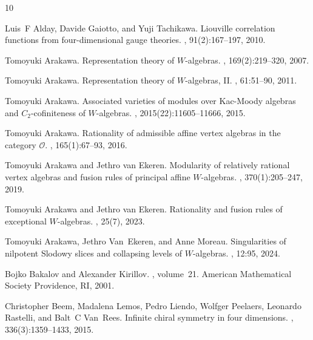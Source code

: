 \documentclass[12pt]{amsart}
\theoremstyle{plain}
\theoremstyle{definition}
\numberwithin{equation}{section}
\begin{document}
\begin{thebibliography}{10}

Luis~F Alday, Davide Gaiotto, and Yuji Tachikawa.
\newblock Liouville correlation functions from four-dimensional gauge theories.
, 91(2):167--197, 2010.

Tomoyuki Arakawa.
\newblock Representation theory of {$W$}-algebras.
, 169(2):219--320, 2007.

Tomoyuki Arakawa.
\newblock Representation theory of {$W$}-algebras, {II}.
, 61:51--90, 2011.

Tomoyuki Arakawa.
\newblock Associated varieties of modules over {K}ac-{M}oody algebras and {$C_2$}-cofiniteness of {$W$}-algebras.
,
  2015(22):11605--11666, 2015.

Tomoyuki Arakawa.
\newblock Rationality of admissible affine vertex algebras in the category
  {$\mathcal{O}$}.
, 165(1):67--93, 2016.

Tomoyuki Arakawa and Jethro van Ekeren.
\newblock Modularity of relatively rational vertex algebras and fusion rules of
  principal affine {$W$}-algebras.
, 370(1):205--247, 2019.

Tomoyuki Arakawa and Jethro van Ekeren.
\newblock Rationality and fusion rules of exceptional {$W$}-algebras.
,
  25(7), 2023.

Tomoyuki Arakawa, Jethro Van~Ekeren, and Anne Moreau.
\newblock Singularities of nilpotent {S}lodowy slices and collapsing levels of
  {$W$}-algebras.
, 12:95, 2024.

Bojko Bakalov and Alexander Kirillov.
, volume~21.
\newblock American Mathematical Society Providence, RI, 2001.

Christopher Beem, Madalena Lemos, Pedro Liendo, Wolfger Peelaers, Leonardo
  Rastelli, and Balt~C Van~Rees.
\newblock Infinite chiral symmetry in four dimensions.
, 336(3):1359--1433,
  2015.


\end{thebibliography}
\end{document}
